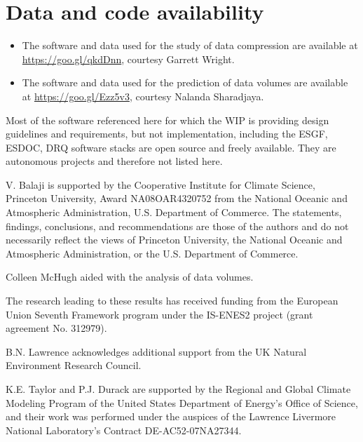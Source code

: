 \documentclass[gmd,manuscript]{copernicus}
\begin{document}
\section{Data and code availability}
\label{sec:code}

\begin{itemize}
\item The software and data used for the study of data compression are
  available at \url{https://goo.gl/qkdDnn}, courtesy Garrett Wright.
\item The software and data used for the prediction of data volumes
  are available at \url{https://goo.gl/Ezz5v3}, courtesy Nalanda
  Sharadjaya.
\end{itemize}

Most of the software referenced here for which the WIP is providing
design guidelines and requirements, but not implementation, including
the ESGF, ESDOC, DRQ software stacks are open source and freely
available. They are autonomous projects and therefore not listed here.

\begin{acknowledgements}
  V. Balaji is supported by the Cooperative Institute for Climate
  Science, Princeton University, Award NA08OAR4320752 from the
  National Oceanic and Atmospheric Administration, U.S. Department of
  Commerce. The statements, findings, conclusions, and recommendations
  are those of the authors and do not necessarily reflect the views of
  Princeton University, the National Oceanic and Atmospheric
  Administration, or the U.S. Department of Commerce.

  Colleen McHugh aided with the analysis of data volumes.
  
  The research leading to these results has received funding from the
  European Union Seventh Framework program under the IS-ENES2 project
  (grant agreement No. 312979).

  B.N. Lawrence acknowledges additional support from the UK Natural
  Environment Research Council.
  
  K.E. Taylor and P.J. Durack are supported by the Regional and Global
  Climate Modeling Program of the United States Department of Energy's
  Office of Science, and their work was performed under the auspices
  of the Lawrence Livermore National Laboratory's Contract
  DE-AC52-07NA27344.
\end{acknowledgements}



\end{document}
